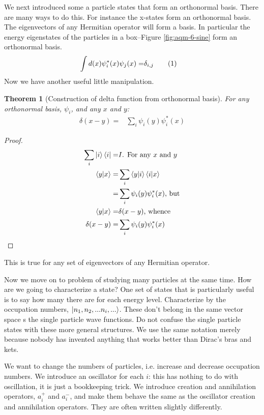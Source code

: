 \documentclass[]{article}
\newcommand\numberthis{\addtocounter{equation}{1}\tag{\theequation}}
\newtheorem{thm}{Theorem}
\begin{document}
We next introduced some a particle states that form an orthonormal basis. There are many ways to do this. For instance the x-states form an orthonormal basis. The eigenvectors of any Hermitian operator will form a basis. In particular the energy eigenstates of the particles in a box--Figure \ref{fig:aqm-6-sine} form an orthonormal basis. 
\begin{align*}
		\int d(x) \psi^*_i(x) \psi_j(x) =& \delta_{i,j} \numberthis \label{eq:orthog:psi}
\end{align*}
Now we have another useful little manipulation. 

\begin{thm}[Construction of delta function from orthonormal basis]\label{thm:orthonormal}
	For any orthonormal basis, $\psi_i$, and any $x$ and $y$:
	\begin{align*}
		\delta(x-y)=& \sum_{i} \psi_i(y) \psi^*_i(x)
	\end{align*}
\end{thm}

\begin{proof}
	\begin{align*}
		\sum_{i} \ket{i} \bra{i} =& I \text{. For any $x$ and $y$}\\
		\braket{y|x}=& \sum_{i} \braket{y|i} \braket{i|x}\\
		=& \sum_{i} \psi_i(y) \psi^*_i(x) \text{, but}\\
		\braket{y|x}=&\delta(x-y) \text{, whence}\\
		\delta(x-y)=& \sum_{i} \psi_i(y) \psi^*_i(x)
	\end{align*}
\end{proof}

This is true for any set of eigenvectors of any Hermitian operator.

Now we move on to problem of studying many particles at the same time. How are we going to characterize a state? One set of states that is particularly useful is to say how many there are for each energy level. Characterize by the occupation numbers,  $\ket{n_1, n_2,...n_i,...}$. These don't belong in the same vector space s the single particle wave functions. Do not confuse the single particle states with these more general structures. We use the same notation merely because nobody has invented anything that works better than Dirac's bras and kets.

We want to change the numbers of particles, i.e. increase and decrease occupation numbers. We introduce an oscillator for each $i$: this has nothing to do with oscillation, it is just a bookkeeping trick. We introduce creation and annihilation operators, $a^+_i$ and $a^-_i$, and make them behave the same as the oscillator creation and annihilation operators. They are often written slightly differently.
\end{document}
